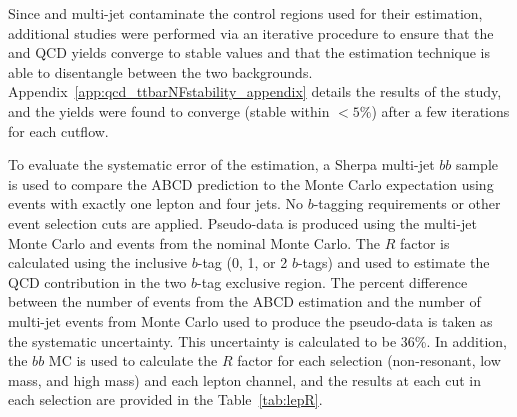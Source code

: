 Since \ttbar and  multi-jet contaminate the control
regions used for their estimation,  additional studies were
performed via an iterative procedure to ensure that the \ttbar and QCD
yields converge to stable values and that the estimation technique is
able to disentangle between the two backgrounds.
Appendix~\ref{app:qcd_ttbarNFstability_appendix} details the results of the study, and the yields 
were found to converge (stable within $<5\%$) after a few iterations for each cutflow.


To evaluate the systematic error of the estimation, a Sherpa multi-jet $bb$ sample is used to compare 
the ABCD prediction to the Monte Carlo expectation using events with exactly one lepton and four jets. 
No $b$-tagging requirements or other event selection cuts are applied. Pseudo-data is produced using
the multi-jet Monte Carlo and events from the nominal \ttbar Monte Carlo. The $R$ factor is calculated
using the inclusive $b$-tag (0, 1, or 2 $b$-tags) and used to estimate the QCD contribution in the two
$b$-tag exclusive region. The percent difference between the number of events from the ABCD estimation 
and the number of multi-jet events from Monte Carlo used to produce the pseudo-data is taken as the 
systematic uncertainty. This uncertainty is calculated to be 36\%. In addition, the $bb$ MC is used to
calculate the $R$ factor for each selection (non-resonant, low mass, and high mass) and each lepton 
channel, and the results at each cut in each selection are provided in the Table~\ref{tab:lepR}. 

